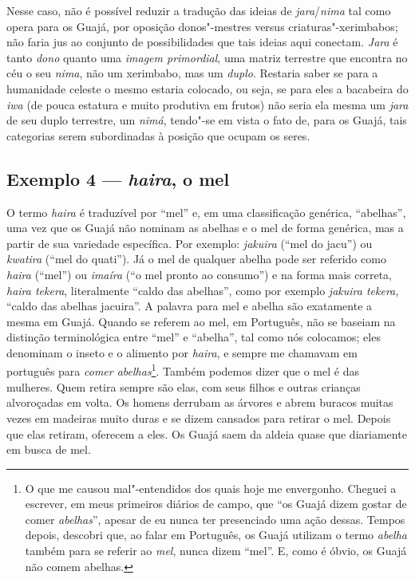 Nesse caso, não é possível reduzir a tradução das ideias de
\emph{jara}/\emph{nima} tal como opera para os Guajá, por oposição
donos"-mestres versus criaturas"-xerimbabos; não faria jus ao conjunto de
possibilidades que tais ideias aqui conectam. \emph{Jara} é tanto
\emph{dono} quanto uma \emph{imagem primordial}, uma matriz terrestre
que encontra no céu o seu \emph{nima}, não um xerimbabo, mas um
\emph{duplo}. Restaria saber se para a humanidade celeste o mesmo
estaria colocado, ou seja, se para eles a bacabeira do \emph{iwa} (de
pouca estatura e muito produtiva em frutos) não seria ela mesma um
\emph{jara} de seu duplo terrestre, um \emph{nimá}, tendo"-se em vista o
fato de, para os Guajá, tais categorias serem subordinadas à posição que
ocupam os seres.

\subsection{Exemplo 4 --- \emph{haira}, o mel}

\forceindent
O termo \emph{haira} é traduzível por ``mel'' e, em uma classificação
genérica, ``abelhas'', uma vez que os Guajá não nominam as abelhas e o mel
de forma genérica, mas a partir de sua variedade específica. Por
exemplo: \emph{jakuira} (``mel do jacu'') ou \emph{kwatira} (``mel do
quati''). Já o mel de qualquer abelha pode ser referido como \emph{haira}
(``mel'') ou \emph{imaíra} (``o mel pronto ao consumo'') e na forma mais
correta, \emph{haira tekera}, literalmente ``caldo das abelhas'', como
por exemplo \emph{jakuira tekera,} ``caldo das abelhas jacuira''. A
palavra para mel e abelha são exatamente a mesma em Guajá. Quando se
referem ao mel, em Português, não se baseiam na distinção terminológica
entre ``mel'' e ``abelha'', tal como nós colocamos; eles denominam o inseto
e o alimento por \emph{haira}, e sempre me chamavam em português para
\emph{comer abelhas}\footnote{O que me causou mal"-entendidos dos quais
  hoje me envergonho. Cheguei a escrever, em meus primeiros diários de
  campo, que ``os Guajá dizem gostar de comer \emph{abelhas}'', apesar de
  eu nunca ter presenciado uma ação dessas. Tempos depois, descobri que,
  ao falar em Português, os Guajá utilizam o termo \emph{abelha} também
  para se referir ao \emph{mel}, nunca dizem ``mel''. E, como é óbvio, os
  Guajá não comem abelhas.}. Também podemos dizer que o mel é das
mulheres. Quem retira sempre são elas, com seus filhos e outras crianças
alvoroçadas em volta. Os homens derrubam as árvores e abrem buracos
muitas vezes em madeiras muito duras e se dizem cansados para retirar o
mel. Depois que elas retiram, oferecem a eles. Os Guajá saem da aldeia
quase que diariamente em busca de mel. 

